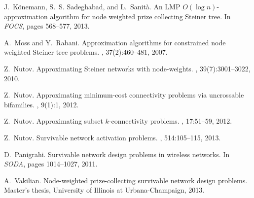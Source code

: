 \documentclass[11pt]{article}
\begin{document}
\begin{thebibliography}{10}
J.~K{\"o}nemann, S.~S. Sadeghabad, and L.~Sanit{\`a}.
\newblock An {LMP} ${O}(\log n)$-approximation algorithm for node weighted
  prize collecting {S}teiner tree.
\newblock In {\em FOCS}, pages 568--577, 2013.

A.~Moss and Y.~Rabani.
\newblock Approximation algorithms for constrained node weighted {S}teiner tree
  problems.
, 37(2):460--481, 2007.

Z.~Nutov.
\newblock Approximating {S}teiner networks with node-weights.
, 39(7):3001--3022, 2010.

Z.~Nutov.
\newblock Approximating minimum-cost connectivity problems via uncrossable
  bifamilies.
, 9(1):1, 2012.

Z.~Nutov.
\newblock Approximating subset $k$-connectivity problems.
, 17:51--59, 2012.

Z.~Nutov.
\newblock Survivable network activation problems.
, 514:105--115, 2013.

D.~Panigrahi.
\newblock Survivable network design problems in wireless networks.
\newblock In {\em SODA}, pages 1014--1027, 2011.

A.~Vakilian.
\newblock Node-weighted prize-collecting survivable network design problems.
\newblock Master's thesis, University of Illinois at Urbana-Champaign, 2013.

\end{thebibliography}
 
\end{document}
